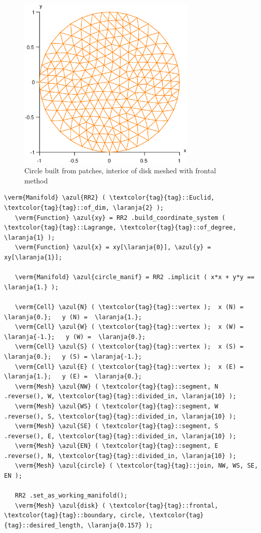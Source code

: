\begin{figure} \centering
 \includegraphics[width=85mm]{disk-with-tri}
 \caption{Circle built from patches, interior of disk meshed with frontal method}
 \label{\numb section 3.\numb fig 1}
\end{figure}

\begin{Verbatim}[commandchars=\\\{\},formatcom=\small\tt,frame=single,
   label=parag-\ref{\numb section 3.\numb parag 1}.cpp,rulecolor=\color{moldura},
   baselinestretch=0.94,framesep=2mm                                            ]
   \verm{Manifold} \azul{RR2} ( \textcolor{tag}{tag}::Euclid, \textcolor{tag}{tag}::of_dim, \laranja{2} );
   \verm{Function} \azul{xy} = RR2 .build_coordinate_system ( \textcolor{tag}{tag}::Lagrange, \textcolor{tag}{tag}::of_degree, \laranja{1} );
   \verm{Function} \azul{x} = xy[\laranja{0}], \azul{y} = xy[\laranja{1}];
   
   \verm{Manifold} \azul{circle_manif} = RR2 .implicit ( x*x + y*y == \laranja{1.} );
   
   \verm{Cell} \azul{N} ( \textcolor{tag}{tag}::vertex );  x (N) =  \laranja{0.};   y (N) =  \laranja{1.};
   \verm{Cell} \azul{W} ( \textcolor{tag}{tag}::vertex );  x (W) = \laranja{-1.};   y (W) =  \laranja{0.};
   \verm{Cell} \azul{S} ( \textcolor{tag}{tag}::vertex );  x (S) =  \laranja{0.};   y (S) = \laranja{-1.};
   \verm{Cell} \azul{E} ( \textcolor{tag}{tag}::vertex );  x (E) =  \laranja{1.};   y (E) =  \laranja{0.};
   \verm{Mesh} \azul{NW} ( \textcolor{tag}{tag}::segment, N .reverse(), W, \textcolor{tag}{tag}::divided_in, \laranja{10} );
   \verm{Mesh} \azul{WS} ( \textcolor{tag}{tag}::segment, W .reverse(), S, \textcolor{tag}{tag}::divided_in, \laranja{10} );
   \verm{Mesh} \azul{SE} ( \textcolor{tag}{tag}::segment, S .reverse(), E, \textcolor{tag}{tag}::divided_in, \laranja{10} );
   \verm{Mesh} \azul{EN} ( \textcolor{tag}{tag}::segment, E .reverse(), N, \textcolor{tag}{tag}::divided_in, \laranja{10} );
   \verm{Mesh} \azul{circle} ( \textcolor{tag}{tag}::join, NW, WS, SE, EN );
   
   RR2 .set_as_working_manifold();
   \verm{Mesh} \azul{disk} ( \textcolor{tag}{tag}::frontal, \textcolor{tag}{tag}::boundary, circle, \textcolor{tag}{tag}::desired_length, \laranja{0.157} );
\end{Verbatim}

